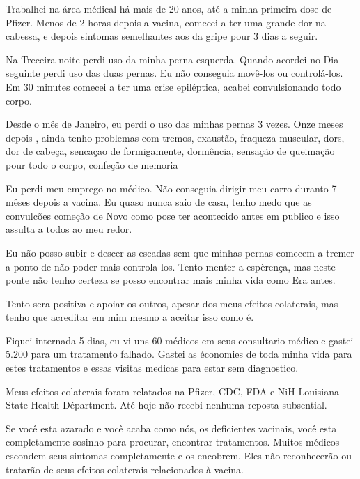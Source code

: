 Trabalhei na área médical há mais de 20 anos, até a minha primeira dose de
Pfizer. Menos de 2 horas depois a vacina, comecei a ter uma grande dor na
cabessa, e depois sintomas semelhantes aos da gripe pour 3 dias a seguir.

Na Treceira noite perdi uso da minha perna esquerda. Quando acordei no Dia
seguinte perdi uso das duas pernas. Eu não conseguia movê-los ou
controlá-los. Em 30 minutes comecei a ter uma crise epiléptica, acabei
convulsionando todo corpo.

Desde o mês de Janeiro, eu perdi o uso das minhas pernas 3 vezes. Onze meses
depois , ainda tenho problemas com tremos, exaustão, fraqueza muscular, dors,
dor de cabeça, sencaçāo de formigamente, dormência, sensação de queimação pour
todo o corpo, confeção de memoria

Eu perdi meu emprego no médico. Não conseguia dirigir meu carro duranto 7 mêses
depois a vacina. Eu quaso nunca saio de casa, tenho medo que as convulcões
começão de Novo como pose ter acontecido antes em publico e isso assulta a todos
ao meu redor.

Eu não posso subir e descer as escadas sem que minhas pernas comecem a tremer a
ponto de não poder mais controla-los.  Tento menter a espèrença, mas neste ponte
não tenho certeza se posso encontrar mais minha vida como Era antes.

Tento sera positiva e apoiar os outros, apesar dos meus efeitos colaterais, mas
tenho que acreditar em mim mesmo a aceitar isso como é.

Fiquei internada 5 dias, eu vi uns 60 médicos em seus consultario médico e
gastei 5.200 para um tratamento falhado. Gastei as économies de toda minha vida
para estes tratamentos e essas visitas medicas para estar sem diagnostico.

Meus efeitos colaterais foram relatados na Pfizer, CDC, FDA e NiH Louisiana
State Health Départment.  Até hoje não recebi nenhuma reposta subsential.

Se você esta azarado e você acaba como nós, os deficientes vacinais, você esta
completamente sosinho para procurar, encontrar tratamentos. Muitos médicos
escondem seus sintomas completamente e os encobrem. Eles não reconhecerão ou
tratarão de seus efeitos colaterais relacionados à vacina.
